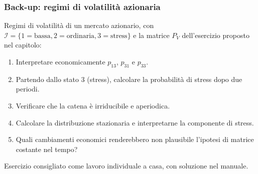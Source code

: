 \documentclass[handout]{beamer}%
\providecommand{\QTR}[2]{\csname #1\endcsname{#2}}
\begin{document}
\begin{frame}%
%

\frametitle{Back-up: regimi di volatilit\`{a} azionaria}%


Regimi di volatilit\`{a} di un mercato azionario, con $\mathcal{I}%
=\{1=\text{bassa},2=\text{ordinaria},3=\text{stress}\}$ e la matrice $P_{V}$
dell'esercizio proposto nel capitolo:

\medskip

\begin{enumerate}
\item[1.] Interpretare economicamente $p_{13}$, $p_{31}$ e $p_{33}$.

\item[2.] Partendo dallo stato $3$ (stress), calcolare la probabilit\`{a} di
stress dopo due periodi.

\item[3.] Verificare che la catena \`{e} irriducibile e aperiodica.

\item[4.] Calcolare la distribuzione stazionaria e interpretarne la componente
di stress.

\item[5.] Quali cambiamenti economici renderebbero non plausibile l'ipotesi di
matrice costante nel tempo?
\end{enumerate}

\medskip

\begin{center}
{\small Esercizio consigliato come lavoro individuale a casa, con soluzione
nel manuale.}
\end{center}%

\transboxout
\end{frame}%
\end{document}
